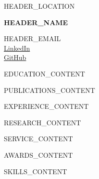 \documentclass[letterpaper,10pt]{article}
\begin{document}
\noindent
\begin{minipage}[t]{0.25\textwidth}
\raggedright
HEADER_LOCATION
\end{minipage}%
\begin{minipage}[t]{0.5\textwidth}
\centering
{\LARGE \textbf{HEADER_NAME}}
\end{minipage}%
\begin{minipage}[t]{0.25\textwidth}
\raggedleft
HEADER_EMAIL\\
\href{https://linkedin.com/in/HEADER_LINKEDIN}{LinkedIn}\\
\href{https://github.com/HEADER_GITHUB}{GitHub}
\end{minipage}

\vspace{-10pt}

EDUCATION_CONTENT

PUBLICATIONS_CONTENT

EXPERIENCE_CONTENT

RESEARCH_CONTENT

SERVICE_CONTENT

AWARDS_CONTENT

SKILLS_CONTENT
\end{document}
